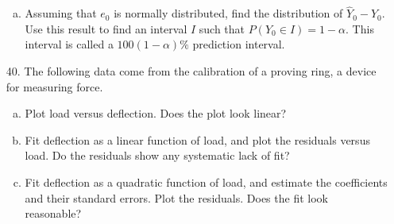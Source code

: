 \documentclass{article}
\begin{document}
\begin{itemize}
\begin{enumerate}[a.]
			\item Assuming that $e_0$ is normally distributed, find the distribution of $\hat Y_0-Y_0.$ Use this result to find an interval $I$ such that $P(Y_0\in I)=1-\alpha.$ This interval is called a $100(1-\alpha)\%$ prediction interval.
				
		\end{enumerate}
		
	\item[40.] The following data come from the calibration of a proving ring, a device for measuring force.
		\begin{enumerate}[a.]
			\item Plot load versus deflection. Does the plot look linear?

			\item Fit deflection as a linear function of load, and plot the residuals versus load. Do the residuals show any systematic lack of fit?

			\item Fit deflection as a quadratic function of load, and estimate the coefficients and their standard errors. Plot the residuals. Does the fit look reasonable?
				
		\end{enumerate}

\end{itemize}
\end{document}
